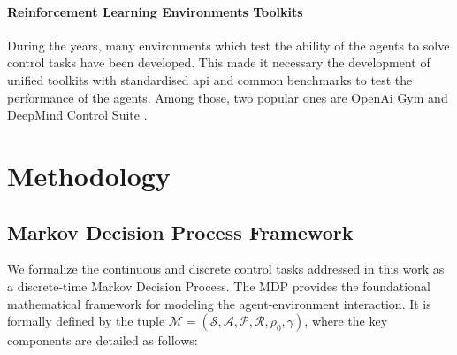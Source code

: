 \documentclass{article}
\begin{document}

\paragraph{Reinforcement Learning Environments Toolkits}
During the years, many environments which test the ability of the agents to solve control tasks have been developed. This made it necessary the development of unified toolkits with standardised api and common benchmarks to test the performance of the agents. Among those, two popular ones are OpenAi Gym \cite{brockman2016openai} and DeepMind Control Suite \cite{tassa2018deepmind}.

\section{Methodology}

\subsection{Markov Decision Process Framework}

We formalize the continuous and discrete control tasks addressed in this work as a discrete-time Markov Decision Process. The MDP provides the foundational mathematical framework for modeling the agent-environment interaction. It is formally defined by the tuple $\mathcal{M} = (\mathcal{S}, \mathcal{A}, \mathcal{P}, \mathcal{R}, \rho_0, \gamma)$, where the key components are detailed as follows:
\end{document}
